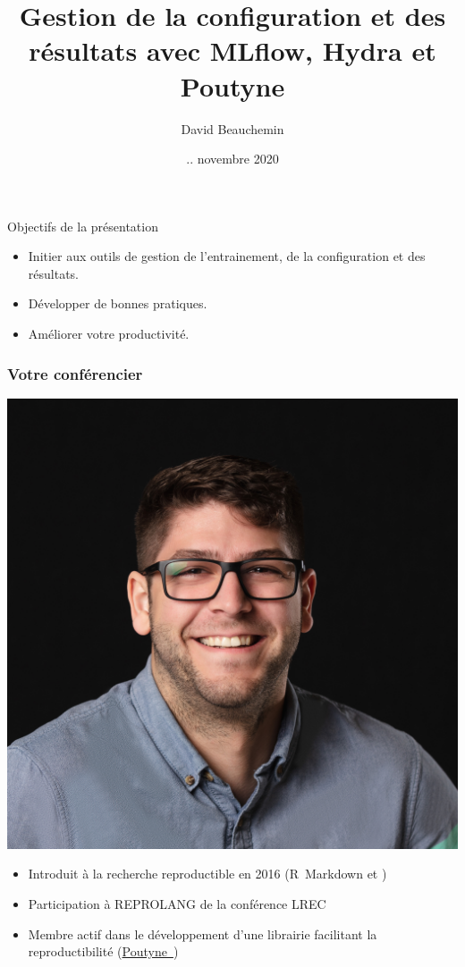\documentclass[aspectratio=169,10pt,xcolor=x11names,english,french]{beamer}
\title{Gestion de la configuration et des résultats avec MLflow, Hydra et Poutyne}
\author{David Beauchemin}
\date{.. novembre 2020}
\newcommand{\link}[2]{\href{#1}{#2~{\smaller\faExternalLink*}}}
\begin{document}
	
	
	
	
	\begin{frame}{Objectifs de la présentation}
		\begin{itemize}
			\item Initier aux outils de gestion de l'entrainement, de la configuration et des résultats.
			\item Développer de bonnes pratiques.
			\item Améliorer votre productivité.
		\end{itemize}
	\end{frame}
	
	\begin{frame}
		\frametitle{Votre conférencier}
		
		\begin{minipage}{0.25\linewidth}
			\includegraphics[width=\linewidth,keepaspectratio]{img/david}
		\end{minipage}
		\hfill
		\begin{minipage}{0.70\linewidth}
			\begin{itemize}
				\item Introduit à la recherche reproductible en 2016 (\mbox{R Markdown} et \faGit)
				\item Participation à REPROLANG de la conférence LREC \cite{garneau2020robust}
				\item Membre actif dans le développement d'une librairie facilitant la reproductibilité (\link{https://poutyne.org/}{Poutyne})
			\end{itemize}
		\end{minipage}
		

\end{frame}
\end{document}

